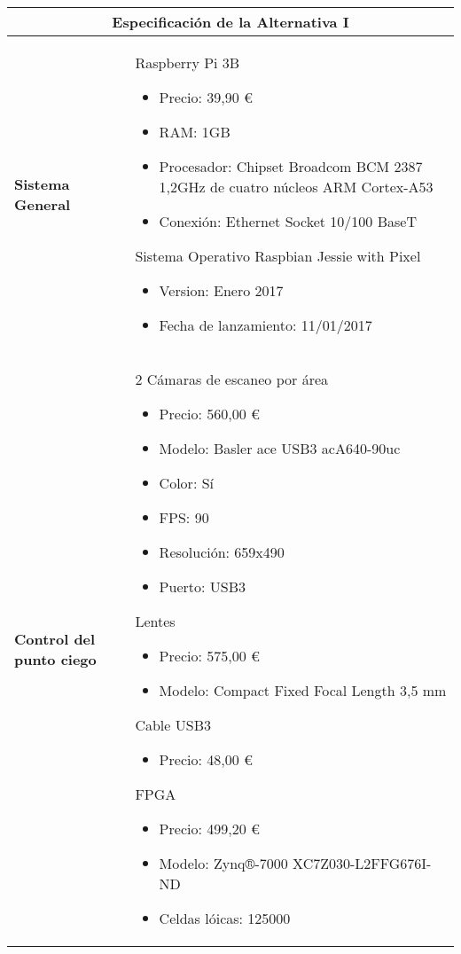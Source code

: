 \begin{table}[H]
\begin{center}
\begin{tabular}{p{5cm} p{8cm}}
\multicolumn{2}{c}{\textbf{Especificación de la Alternativa I} } \\
\hline \hline

\textbf{Sistema General} &
Raspberry Pi 3B
\begin{itemize}
    \item Precio: 39,90 \euro
    \item RAM: 1GB
    \item Procesador: Chipset Broadcom BCM 2387 1,2GHz de cuatro núcleos ARM Cortex-A53
    \item Conexión: Ethernet Socket 10/100 BaseT
\end{itemize}
Sistema Operativo Raspbian Jessie with Pixel
\begin{itemize}
    \item Version: Enero 2017
    \item Fecha de lanzamiento: 11/01/2017
\end{itemize}
\\ \hline

\textbf{Control del punto ciego} &
2 Cámaras de escaneo por área
\begin{itemize}
    \item Precio: 560,00 \euro
    \item Modelo: Basler ace USB3 acA640-90uc
    \item Color: Sí
    \item FPS: 90
    \item Resolución: 659x490
    \item Puerto: USB3
\end{itemize}
Lentes
\begin{itemize}
    \item Precio: 575,00 \euro
    \item Modelo: Compact Fixed Focal Length 3,5 mm
\end{itemize}
Cable USB3
\begin{itemize}
    \item Precio: 48,00 \euro
\end{itemize}
FPGA
\begin{itemize}
    \item Precio: 499,20 \euro
    \item Modelo: Zynq®-7000 XC7Z030-L2FFG676I-ND
    \item Celdas lóicas: 125000
\end{itemize}



\end{tabular}
\end{center}
\end{table}
